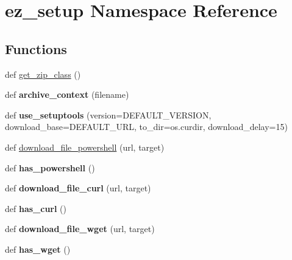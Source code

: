 \hypertarget{namespaceez__setup}{}\section{ez\+\_\+setup Namespace Reference}
\label{namespaceez__setup}
\subsection*{Functions}
\begin{DoxyCompactItemize}
\item 
def \hyperlink{namespaceez__setup_a61495793b812c47ba054dd058fa4ba0e}{get\+\_\+zip\+\_\+class} ()
\item 
\mbox{\label{namespaceez__setup_aa735e505d85a6882c1ecc07850dfe0b5}} 
def {\bfseries archive\+\_\+context} (filename)
\item 
\mbox{\label{namespaceez__setup_a2d1c4fef79de3de83e9206d2329caebc}} 
def {\bfseries use\+\_\+setuptools} (version=D\+E\+F\+A\+U\+L\+T\+\_\+\+V\+E\+R\+S\+I\+ON, download\+\_\+base=D\+E\+F\+A\+U\+L\+T\+\_\+\+U\+RL, to\+\_\+dir=os.\+curdir, download\+\_\+delay=15)
\item 
def \hyperlink{namespaceez__setup_a545d9bb16a7c1509aeb0af7ff5c63a70}{download\+\_\+file\+\_\+powershell} (url, target)
\item 
\mbox{\label{namespaceez__setup_a6ae1e68431f321c135c69001fcca43b5}} 
def {\bfseries has\+\_\+powershell} ()
\item 
\mbox{\label{namespaceez__setup_a5c318033f0bb01ca53fd588c46f7b7ca}} 
def {\bfseries download\+\_\+file\+\_\+curl} (url, target)
\item 
\mbox{\label{namespaceez__setup_a4377c05e875ddaef521db5db8d5d97d8}} 
def {\bfseries has\+\_\+curl} ()
\item 
\mbox{\label{namespaceez__setup_af87aff324e74dd596c88cbbb05bdc0a0}} 
def {\bfseries download\+\_\+file\+\_\+wget} (url, target)
\item 
\mbox{\label{namespaceez__setup_acc4250f7e8576ec6578b5dfcabe09d43}} 
def {\bfseries has\+\_\+wget} ()

\end{DoxyCompactItemize}
